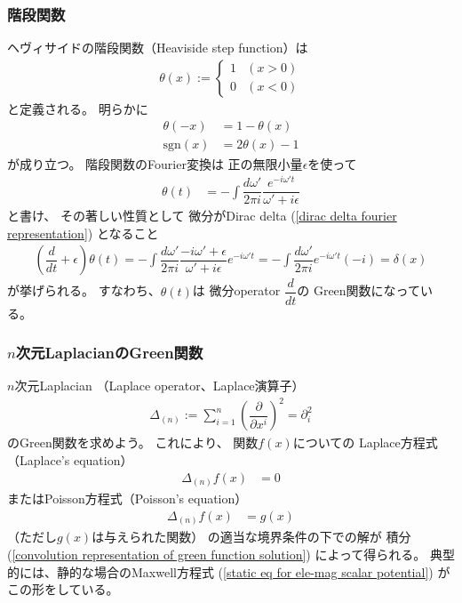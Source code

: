 \subsubsection{階段関数}

ヘヴィサイドの階段関数（Heaviside step function）は
\begin{align}
    \theta(x)
    :=
    \begin{cases}
        1 & (x > 0)
    \\
        0 & (x < 0)
    \end{cases}
\label{definition of step function}
\end{align}
と定義される。
明らかに
\begin{subequations}
\begin{align}
    \theta(- x) &= 1 - \theta(x)
\\
    \mathrm{sgn}(x)
    &=
    2 \theta(x) - 1
\label{step function and sign}
\end{align}
\end{subequations}
が成り立つ。
階段関数のFourier変換は
正の無限小量$\epsilon$を使って
\begin{align}
  \theta(t)
  &=
    - \int\dfrac{d \omega'}{2 \pi i}
    \dfrac{e^{- i \omega' t}}{\omega' + i \epsilon}
\label{fourier transformation of step function}
\end{align}
と書け、
その著しい性質として
微分がDirac delta
(\ref{dirac delta fourier representation})
となること
\begin{align}
    \left(
        \dfrac{d}{dt}
        +
        \epsilon
    \right)
    \theta(t)
=
    - \int\dfrac{d \omega'}{2 \pi i}
    \dfrac{
        - i \omega' + \epsilon
    }{\omega' + i \epsilon}
    e^{- i \omega' t}
=
    - \int\dfrac{d \omega'}{2 \pi i}
    e^{- i \omega' t}
    ( - i)
=
    \delta(x)
\label{derivative of step function}
\end{align}
が挙げられる。
すなわち、$\theta(t)$は
微分operator $\dfrac{d}{dt}$の
Green関数になっている。

\subsubsection{$n$次元LaplacianのGreen関数}

$n$次元Laplacian
（Laplace operator、Laplace演算子）
\begin{align}
    \Delta_{(n)}
    :=
    \sum_{i=1}^n
    \left(
        \dfrac{\partial}{\partial x^i}
    \right)^2
    =
    \partial_i^2
\end{align}
のGreen関数を求めよう。
これにより、
関数$f(x)$についての
Laplace方程式（Laplace's equation）
\begin{align}
    \Delta_{(n)} f(x)
    &= 0
\label{laplace eq}
\end{align}
またはPoisson方程式（Poisson's equation）
\begin{align}
    \Delta_{(n)} f(x)
    &= g(x)
\label{poisson eq}
\end{align}
（ただし$g(x)$は与えられた関数）
の適当な境界条件の下での解が
積分
(\ref{convolution representation of green function solution})
によって得られる。
典型的には、静的な場合のMaxwell方程式
(\ref{static eq for ele-mag scalar potential})
がこの形をしている。

